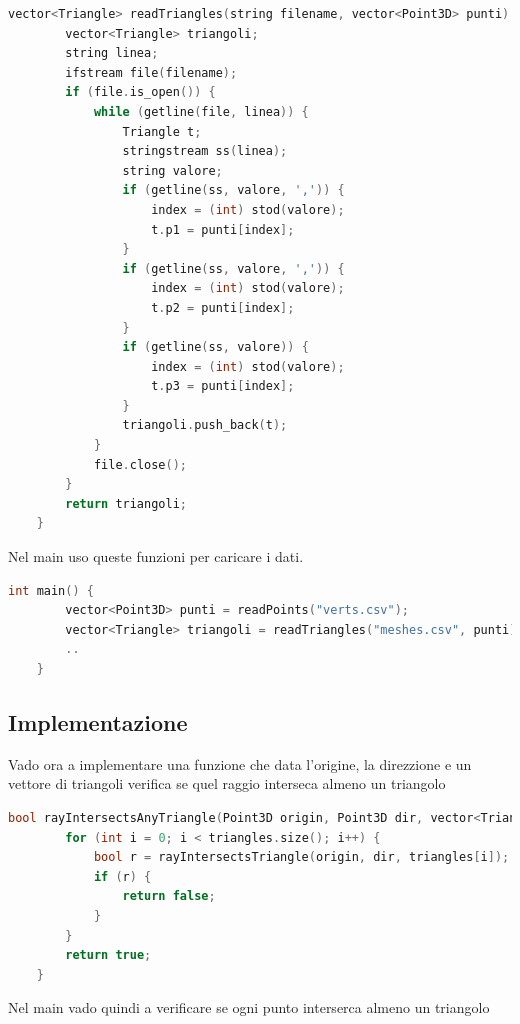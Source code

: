 \documentclass[a4paper]{article}
\begin{document}
\begin{lstlisting}[language=c++]
    vector<Triangle> readTriangles(string filename, vector<Point3D> punti) {
        vector<Triangle> triangoli;
        string linea;
        ifstream file(filename);
        if (file.is_open()) {
            while (getline(file, linea)) {
                Triangle t;
                stringstream ss(linea);
                string valore;
                if (getline(ss, valore, ',')) {
                    index = (int) stod(valore);
                    t.p1 = punti[index];
                }
                if (getline(ss, valore, ',')) {
                    index = (int) stod(valore);
                    t.p2 = punti[index];
                }
                if (getline(ss, valore)) {
                    index = (int) stod(valore);
                    t.p3 = punti[index];
                }
                triangoli.push_back(t);
            }
            file.close();
        }
        return triangoli;
    }
\end{lstlisting}

Nel main uso queste funzioni per caricare i dati.

\begin{lstlisting}[language=c++]
    int main() {
        vector<Point3D> punti = readPoints("verts.csv");
        vector<Triangle> triangoli = readTriangles("meshes.csv", punti);
        ..
    } 
\end{lstlisting}

\newpage

\subsection{Implementazione}

Vado ora a implementare una funzione che data l'origine, la direzzione e un vettore di triangoli verifica se quel raggio interseca almeno un triangolo

\begin{lstlisting}[language=c++]
    bool rayIntersectsAnyTriangle(Point3D origin, Point3D dir, vector<Triangle> triangles) {
        for (int i = 0; i < triangles.size(); i++) {
            bool r = rayIntersectsTriangle(origin, dir, triangles[i]);
            if (r) {
                return false;
            }
        }
        return true;
    }
\end{lstlisting}

Nel main vado quindi a verificare se ogni punto interserca almeno un triangolo
\end{document}
